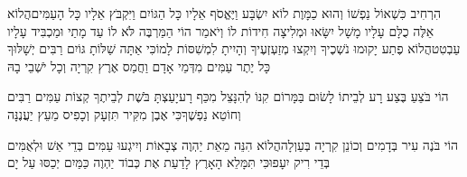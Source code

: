 \documentclass[../main/main.tex]{subfiles}
\begin{document}
\begin{multicols*}{\ncols}
הִרְחִיב כִּשְׁאוֹל נַפְשׁוֹ וְהוּא כַמָּוֶת לוֹא\SubEnd{} יִשְׂבָּע וַיֶּאֱסֹף אֵלָיו כָּל הַגּוֹיִם וַיִּקְבֹּץ אֵלָיו כָּל הָעַמִּים\PreVerseSpace{}הֲלוֹא אֵלֶּה כֻלָּם עָלָיו מָשָׁל יִשָּׂאוּ וּמְלִיצָה חִידוֹת לוֹ וְיֹאמַר הוֹי הַמַּרְבֶּה לֹּא לוֹ עַד מָתַי וּמַכְבִּיד עָלָיו עַבְטִט\PreVerseSpace{}הֲלוֹא פֶתַע יָקוּמוּ נֹשְׁכֶיךָ וְיִקְצוּ מְזַעְזְעֶיךָ וְהָיִיתָ לִמְשִׁסּוֹת לָמוֹ\PreVerseSpace{}כִּי אַתָּה שַׁלּוֹתָ גּוֹיִם רַבִּים יְשָׁלּוּךָ כָּל יֶתֶר עַמִּים מִדְּמֵי אָדָם וַחֲמַס אֶרֶץ קִרְיָה וְכָל יֹשְׁבֵי בָהּ\OpenSection{}\par
{}הוֹי בֹּצֵעַ בֶּצַע רָע לְבֵיתוֹ לָשׂוּם בַּמָּרוֹם קִנּוֹ לְהִנָּצֵל מִכַּף רָע\PreVerseSpace{}יָעַצְתָּ בֹּשֶׁת לְבֵיתֶךָ קְצוֹת עַמִּים רַבִּים וְחוֹטֵא נַפְשֶׁךָ\PreVerseSpace{}כִּי אֶבֶן מִקִּיר תִּזְעָק וְכָפִיס מֵעֵץ יַעֲנֶנָּה\OpenSection{}\par
{}הוֹי בֹּנֶה עִיר בְּדָמִים וְכוֹנֵן קִרְיָה בְּעַוְלָה\PreVerseSpace{}הֲלוֹא הִנֵּה מֵאֵת יַהְוֶה צְבָאוֹת וְיִיגְעוּ עַמִּים בְּדֵי אֵשׁ וּלְאֻמִּים בְּדֵי רִיק יִעָפוּ\PreVerseSpace{}כִּי תִּמָּלֵא הָאָרֶץ לָדַעַת אֶת כְּבוֹד יַהְוֶה כַּמַּיִם יְכַסּוּ עַל יָם\OpenSection{}\par

\end{multicols*}
\end{document}
